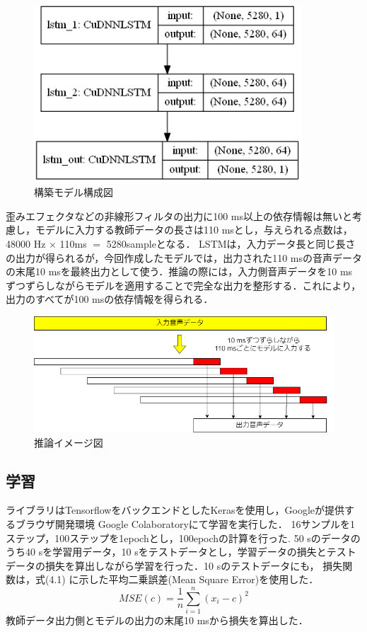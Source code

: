 \documentclass{jreport}		%
\begin{document}
\begin{figure}[htbp]
 \begin{center}
  \includegraphics[width=100mm]{model.png}
 \end{center}
 \caption{構築モデル構成図}
 \label{fig:one}
\end{figure}

歪みエフェクタなどの非線形フィルタの出力に100 ms以上の依存情報は無いと考慮し，モデルに入力する教師データの長さは110 msとし，与えられる点数は，48000 Hz $\times$ 110ms $=$ 5280sampleとなる．
LSTMは，入力データ長と同じ長さの出力が得られるが，今回作成したモデルでは，出力された110 msの音声データの末尾10 msを最終出力として使う．推論の際には，入力側音声データを10 msずつずらしながらモデルを適用することで完全な出力を整形する．これにより，出力のすべてが100 msの依存情報を得られる．

\begin{figure}[htbp]
 \begin{center}
  \includegraphics[width=140mm]{suiron.png}
 \end{center}
 \caption{推論イメージ図}
 \label{fig:one}
\end{figure}

\subsection{学習}
ライブラリはTensorflowをバックエンドとしたKerasを使用し，Googleが提供するブラウザ開発環境 Google Colaboratoryにて学習を実行した．
16サンプルを1ステップ，100ステップを1epochとし，100epochの計算を行った.
50 sのデータのうち40 sを学習用データ，10 sをテストデータとし，学習データの損失とテストデータの損失を算出しながら学習を行った．10 sのテストデータにも，
損失関数は，式(4.1) に示した平均二乗誤差(Mean Square Error)を使用した．
\begin{equation}
  MSE(c) = \frac{1}{n}\sum_{i=1}^{n}(x_i-c)^2
\end{equation}
教師データ出力側とモデルの出力の末尾10 msから損失を算出した．
\end{document}
